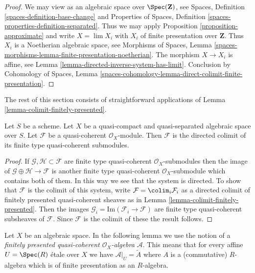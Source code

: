 \begin{proof}
We may view as an algebraic space over $\Spec(\mathbf{Z})$, see
Spaces, Definition \ref{spaces-definition-base-change} and
Properties of Spaces, Definition \ref{spaces-properties-definition-separated}.
Thus we may apply Proposition \ref{proposition-approximate}
and write $X = \lim X_i$ with $X_i$ of finite presentation over $\mathbf{Z}$.
Thus $X_i$ is a Noetherian algebraic space, see
Morphisms of Spaces, Lemma
\ref{spaces-morphisms-lemma-finite-presentation-noetherian}.
The morphism $X \to X_i$ is affine, see
Lemma \ref{lemma-directed-inverse-system-has-limit}.
Conclusion by
Cohomology of Spaces, Lemma
\ref{spaces-cohomology-lemma-direct-colimit-finite-presentation}.
\end{proof}

\noindent
The rest of this section consists of straightforward
applications of Lemma \ref{lemma-colimit-finitely-presented}.

\begin{lemma}
\label{lemma-directed-colimit-finite-type}
Let $S$ be a scheme. Let $X$ be a quasi-compact and quasi-separated
algebraic space over $S$.
Let $\mathcal{F}$ be a quasi-coherent $\mathcal{O}_X$-module.
Then $\mathcal{F}$ is the directed colimit of its finite type
quasi-coherent submodules.
\end{lemma}

\begin{proof}
If $\mathcal{G}, \mathcal{H} \subset \mathcal{F}$ are finite type
quasi-coherent $\mathcal{O}_X$-submodules then the image
of $\mathcal{G} \oplus \mathcal{H} \to \mathcal{F}$ is another
finite type quasi-coherent $\mathcal{O}_X$-submodule which contains
both of them. In this way we see that the system is directed.
To show that $\mathcal{F}$ is the colimit of this system, write
$\mathcal{F} = \colim_i \mathcal{F}_i$ as a directed
colimit of finitely presented quasi-coherent sheaves as in
Lemma \ref{lemma-colimit-finitely-presented}.
Then the images $\mathcal{G}_i = \text{Im}(\mathcal{F}_i \to \mathcal{F})$ are
finite type quasi-coherent subsheaves of $\mathcal{F}$. Since
$\mathcal{F}$ is the colimit of these the result follows.
\end{proof}

\noindent
Let $X$ be an algebraic space. In the following lemma we use the notion
of a {\it finitely presented quasi-coherent $\mathcal{O}_X$-algebra
$\mathcal{A}$}. This means that for every affine
$U = \Spec(R)$ \'etale over $X$ we have $\mathcal{A}|_U = \widetilde{A}$
where $A$ is a (commutative) $R$-algebra which is of finite presentation
as an $R$-algebra.

